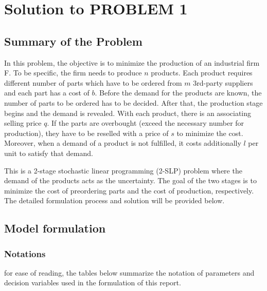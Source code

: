 \newpage
\section{Solution to PROBLEM 1}
	\subsection{Summary of the Problem}

	\qquad In this problem, the objective is to minimize the production of an industrial firm F. To be specific, the firm needs to produce $n$ products. Each product requires different number of parts which have to be ordered from $m$ 3rd-party suppliers and each part has a cost of $b$. Before the demand for the products are known, the number of parts to be ordered has to be decided. After that, the production stage begins and the demand is revealed. With each product, there is an associating selling price $q$. If the parts are overbought (exceed the necessary number for production), they have to be reselled with a price of $s$ to minimize the cost. Moreover, when a demand of a product is not fulfilled, it costs additionally $l$ per unit to satisfy that demand.

	\qquad This is a 2-stage stochastic linear programming (2-SLP) problem where the demand of the products acts as the uncertainty. The goal of the two stages is to minimize the cost of preordering parts and the cost of production, respectively. The detailed formulation process and solution will be provided below.
	
	\subsection{Model formulation}
		\subsubsection{Notations}
		
		\qquad for ease of reading, the tables below summarize the notation of parameters and decision variables used in 
the formulation of this report.

